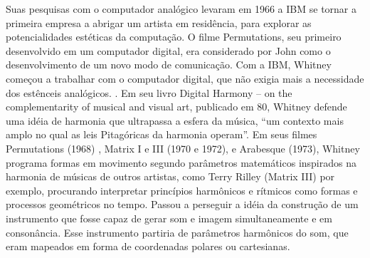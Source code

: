 Suas pesquisas com o computador analógico levaram em 1966 a IBM se tornar a primeira empresa a abrigar um artista em residência, para explorar as potencialidades estéticas da computação. O filme Permutations, seu primeiro desenvolvido em um computador digital, era considerado por John como o desenvolvimento de um novo modo de comunicação. Com a IBM, Whitney começou a trabalhar com o computador digital, que não exigia mais a necessidade dos estênceis analógicos. \cite{Youngblood1970}. 
Em seu livro Digital Harmony – on the complementarity of musical and visual art, publicado em 80, Whitney defende uma idéia de harmonia que ultrapassa a esfera da música, ``um contexto mais amplo no qual as leis Pitagóricas da harmonia operam''. Em seus filmes Permutations (1968) , Matrix I e III (1970 e 1972), e Arabesque (1973), Whitney programa formas em movimento segundo parâmetros matemáticos inspirados na harmonia de músicas de outros artistas, como Terry Rilley (Matrix III) por exemplo, procurando interpretar princípios harmônicos e rítmicos como formas e processos geométricos no tempo. Passou a perseguir a idéia da construção de um instrumento que fosse capaz de gerar som e imagem simultaneamente e em consonância. Esse instrumento partiria de parâmetros harmônicos do som, que eram mapeados em forma de coordenadas polares ou cartesianas. \cite{Whitney1980}

